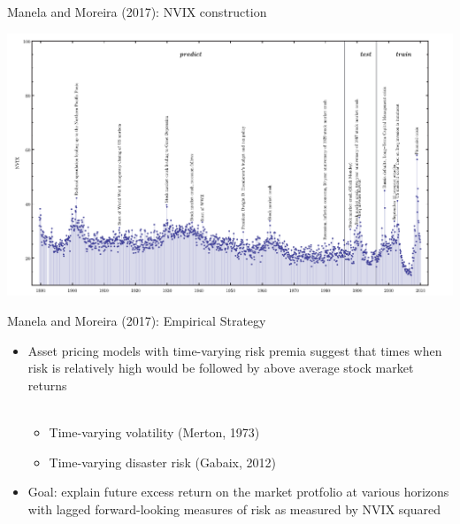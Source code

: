 \documentclass[english]{beamer}
\begin{document}
\begin{frame}{\small{Manela and Moreira (2017): NVIX construction}}
\vspace{-7pt}
\begin{center}
\includegraphics[scale=0.35]{Images/mm2017-2.png}
\end{center}
\end{frame}

\begin{frame}{Manela and Moreira (2017): Empirical Strategy}
\begin{itemize}
\setlength{\itemsep}{1.5em}
\item Asset pricing models with time-varying risk premia suggest that times when risk is relatively high would be followed by above average stock market returns
\\~\
\begin{itemize}
    \item Time-varying volatility (Merton, 1973)
    \item Time-varying disaster risk (Gabaix, 2012)
\end{itemize}
\item Goal: explain future excess return on the market protfolio at various horizons with lagged forward-looking measures of risk as measured by NVIX squared
\end{itemize}
\end{frame}%
\end{document}

